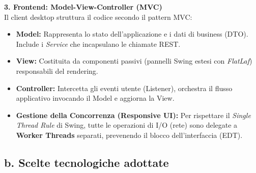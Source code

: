 \documentclass[a4paper,12pt]{article}
\begin{document}
\begin{tcolorbox}
\textbf{3. Frontend: Model-View-Controller (MVC)} \\
Il client desktop struttura il codice secondo il pattern MVC:
\begin{itemize}
    \item \textbf{Model:} Rappresenta lo stato dell'applicazione e i dati di business (DTO). Include i \textit{Service} che incapsulano le chiamate REST.
    \item \textbf{View:} Costituita da componenti passivi (pannelli Swing estesi con \textit{FlatLaf}) responsabili del rendering.
    \item \textbf{Controller:} Intercetta gli eventi utente (Listener), orchestra il flusso applicativo invocando il Model e aggiorna la View.
    \item \textbf{Gestione della Concorrenza (Responsive UI):} Per rispettare il \textit{Single Thread Rule} di Swing, tutte le operazioni di I/O (rete) sono delegate a \textbf{Worker Threads} separati, prevenendo il blocco dell'interfaccia (EDT).
\end{itemize}
\end{tcolorbox}


\subsection*{b. Scelte tecnologiche adottate}
{}
\end{document}
